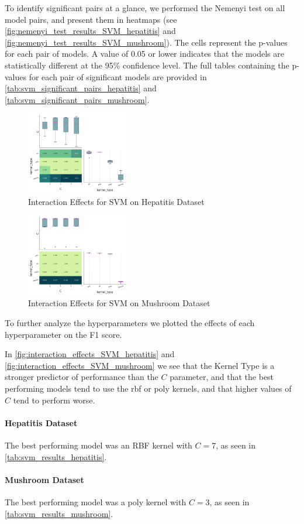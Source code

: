 To identify significant pairs at a glance, we performed the Nemenyi test on all model pairs,
and present them in heatmaps (see \autoref{fig:nemenyi_test_results_SVM_hepatitis} and \autoref{fig:nemenyi_test_results_SVM_mushroom}).
The cells represent the p-values for each pair of models. A value of 0.05 or lower indicates that the models are statistically different
at the 95\% confidence level. The full tables containing the p-values for each pair of significant models are provided in \autoref{tab:svm_significant_pairs_hepatitis} and \autoref{tab:svm_significant_pairs_mushroom}.




\begin{figure}
    \centering
    \includegraphics[width=0.4\textwidth]{figures/interaction_effects_SVM_hepatitis.png}
    \caption{Interaction Effects for SVM on Hepatitis Dataset}
    \label{fig:interaction_effects_SVM_hepatitis}
\end{figure}

\begin{figure}
    \centering
    \includegraphics[width=0.4\textwidth]{figures/interaction_effects_SVM_mushroom.png}
    \caption{Interaction Effects for SVM on Mushroom Dataset}
    \label{fig:interaction_effects_SVM_mushroom}
\end{figure}

To further analyze the hyperparameters we plotted the effects of each hyperparameter on the F1 score.

In \autoref{fig:interaction_effects_SVM_hepatitis} and \autoref{fig:interaction_effects_SVM_mushroom} we see that the Kernel Type is a stronger predictor of performance than the $C$ parameter, and that
the best performing models tend to use the rbf or poly kernels, and that higher values of $C$ tend to perform worse.

\paragraph{Hepatitis Dataset}
The best performing model was an RBF kernel with $C=7$, as seen in \autoref{tab:svm_results_hepatitis}.

\paragraph{Mushroom Dataset}
The best performing model was a poly kernel with $C=3$, as seen in \autoref{tab:svm_results_mushroom}.
